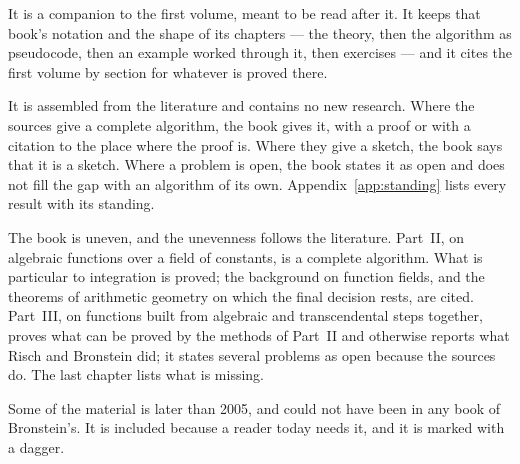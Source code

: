 It is a companion to the first volume, meant to be read after it. It keeps
that book's notation and the shape of its chapters --- the theory, then the
algorithm as pseudocode, then an example worked through it, then exercises ---
and it cites the first volume by section for whatever is proved there.

It is assembled from the literature and contains no new research. Where the
sources give a complete algorithm, the book gives it, with a proof or with a
citation to the place where the proof is. Where they give a sketch, the book
says that it is a sketch. Where a problem is open, the book states it as open
and does not fill the gap with an algorithm of its own.
Appendix~\ref{app:standing} lists every result with its standing.

The book is uneven, and the unevenness follows the literature. Part~II, on
algebraic functions over a field of constants, is a complete algorithm. What
is particular to integration is proved; the background on function fields,
and the theorems of arithmetic geometry on which the final decision rests,
are cited. Part~III, on functions built from algebraic and transcendental steps
together, proves what can be proved by the methods of Part~II and otherwise
reports what Risch and Bronstein did; it states several problems as open
because the sources do. The last chapter lists what is missing.

Some of the material is later than 2005, and could not have been in any book
of Bronstein's. It is included because a reader today needs it, and it is
marked with a dagger\later.

